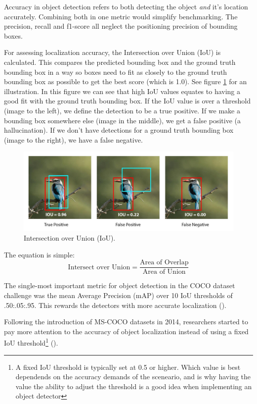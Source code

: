 Accuracy in object detection refers to both detecting the object \textit{and} it's location accurately. Combining both in one metric would simplify benchmarking. The precision, recall and f1-score all neglect the positioning precision of bounding boxes. 

For assessing localization accuracy, the Intersection over Union (IoU) is calculated. This compares the predicted bounding box and the ground truth bounding box in a way so boxes need to fit as closely to the ground truth bounding box as possible to get the best score (which is 1.0). See figure \ref{fig:IoU} for an illustration. In this figure we can see that high IoU values equates to having a good fit with the ground truth bounding box. If the IoU value is over a threshold (image to the left), we define the detection to be a true positive. If we make a bounding box somewhere else (image in the middle), we get a false positive (a hallucination). If we don't have detections for a ground truth bounding box (image to the right), we have a false negative.

\begin{figure}[H]
    \centering
    \includegraphics[width=1.0\linewidth]{Images/Diagrams/IoU_better.jpg}
    \caption{Intersection over Union (IoU).}
    \label{fig:IoU}
\end{figure}

The equation is simple:
\begin{equation}
    \text{Intersect over Union} = \frac{\text{Area of Overlap}}{\text{Area of Union}}
\end{equation}

The single-most important metric for object detection in the COCO dataset challenge was the mean Average Precision (mAP) over 10 IoU thresholds of .50:.05:.95. This rewards the detectors with more accurate localization (\cite{li2014cocodataset}).

Following the introduction of MS-COCO datasets in 2014, researchers started to pay more attention to the accuracy of object localization instead of using a fixed IoU threshold\footnote{A fixed IoU threshold is typically set at 0.5 or higher. Which value is best dependends on the accuracy demands of the sceneario, and is why having the value the ability to adjust the threshold is a good idea when implementing an object detector} (\cite{zou2023object_detection_in_20_years}).


